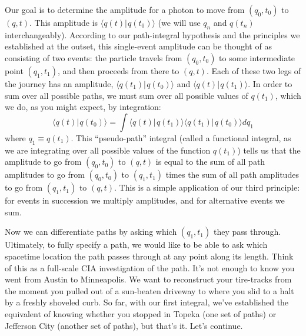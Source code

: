 \documentclass{amsart}
\newcommand{\md}{d}		%
\newcommand{\ket}[1]{\vert \hspace{1pt}#1\rangle}
\newcommand{\braket}[2]{\langle #1 \ket{#2}}
\newcommand{\qv}{q}
\begin{document}
Our goal is to determine the amplitude for a photon to move from $(\qv_0,t_0)$ to $(\qv,t)$.  This amplitude is $\braket{\qv(t)}{\qv(t_0)}$ (we will use $\qv_n$ and $\qv(t_n)$ interchangeably).  According to our path-integral hypothesis and the principles we established at the outset, this single-event amplitude can be thought of as consisting of two events: the particle travels from $(\qv_0,t_0)$ to some intermediate point $(\qv_1,t_1)$, and then proceeds from there to $(\qv,t)$.  Each of these two legs of the journey has an amplitude,  $\braket{\qv(t_1)}{\qv(t_0)}$ and $\braket{\qv(t)}{\qv(t_1)}$.  In order to sum over all possible paths, we must sum over all possible values of $\qv(t_1)$, which we do, as you might expect, by integration:
\begin{equation*}
\braket{\qv(t)}{\qv(t_0)} = \int \braket{\qv(t)}{\qv(t_1)}\braket{\qv(t_1)}{\qv(t_0)} \md \qv_1
\end{equation*}
where $\qv_1 \equiv \qv(t_1)$.  This ``pseudo-path'' integral (called a functional integral, as we are integrating over all possible values of the function $\qv(t_1)$) tells us that the amplitude to go from $(\qv_0,t_0)$ to $(\qv,t)$ is equal to the sum of all path amplitudes to go from $(\qv_0,t_0)$ to $(\qv_1,t_1)$ times the sum of all path amplitudes to go from $(\qv_1,t_1)$ to $(\qv,t)$.  This is a simple application of our third principle: for events in succession we multiply amplitudes, and for alternative events we sum.

Now we can differentiate paths by asking which $(\qv_1,t_1)$ they pass through.  Ultimately, to fully specify a path, we would like to be able to ask which spacetime location the path passes through at any point along its length.  Think of this as a full-scale CIA investigation of the path.  It's not enough to know you went from Austin to Minneapolis.  We want to reconstruct your tire-tracks from the moment you pulled out of a sun-beaten driveway to where you slid to a halt by a freshly shoveled curb.  So far, with our first integral, we've established the equivalent of knowing whether you stopped in Topeka (one set of paths) or Jefferson City (another set of paths), but that's it.  Let's continue.
\end{document}
